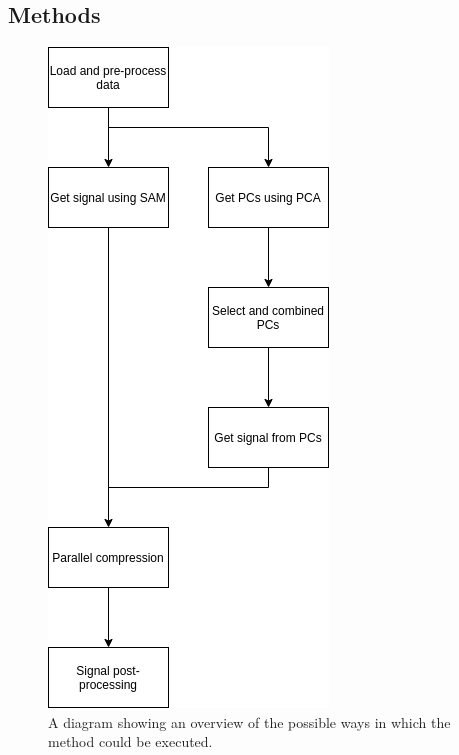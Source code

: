         \subsection{Methods} \label{sec:pca_data_driven_surrogate_signal_extraction_methods_for_dynamic_pet_methods}
            \begin{figure}
                \centering
                
                \includegraphics[width=0.6\linewidth]{figures/pca_data_driven_surrogate_signal_extraction_methods_for_dynamic_pet_methods_data_driven_surrogate_signal_extraction_overview.png}
                
                \captionsetup{singlelinecheck=false, justification=centering}
                \caption{A diagram showing an overview of the possible ways in which the method could be executed.}
                \label{fig:pca_data_driven_surrogate_signal_extraction_methods_for_dynamic_pet_methods_data_driven_surrogate_signal_extraction_overview}
            \end{figure}
            
